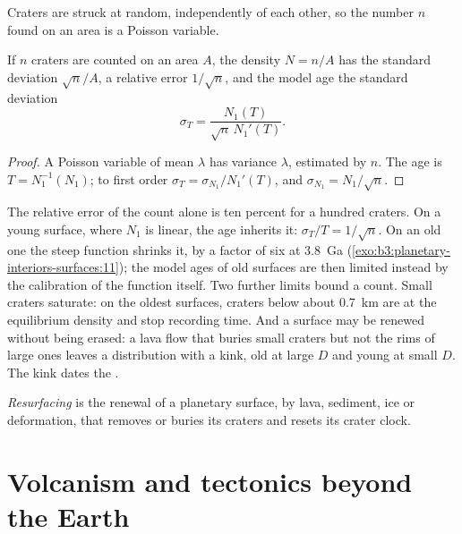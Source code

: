 Craters are struck at random, independently of each other, so the number
$n$ found on an area is a Poisson variable.

\begin{proposition}\label{prop:b3:planetary-interiors-surfaces:poisson}
If $n$ craters are counted on an area $A$, the density $N = n/A$ has the
standard deviation $\sqrt n/A$, a relative error $1/\sqrt n$, and the model
age the standard deviation
\[
  \sigma_T = \frac{N_1(T)}{\sqrt n\,N_1'(T)} .
\]
\end{proposition}

\begin{proof}
A Poisson variable of mean $\lambda$ has variance $\lambda$, estimated by
$n$. The age is $T = N_1^{-1}(N_1)$; to first order $\sigma_T =
\sigma_{N_1}/N_1'(T)$, and $\sigma_{N_1} = N_1/\sqrt n$.
\end{proof}

The relative error of the count alone is ten percent for a hundred
craters. On a young surface, where $N_1$ is linear, the age inherits it:
$\sigma_T/T = 1/\sqrt n$. On an old one the steep function shrinks it, by
a factor of six at \qty{3.8}{Ga} (\cref{exo:b3:planetary-interiors-surfaces:11});
the model ages of old surfaces are then limited instead by the calibration
of the function itself. Two further limits bound a count. Small craters
saturate: on the oldest surfaces, craters below about \qty{0.7}{km} are at
the equilibrium density and stop recording time. And a surface may be renewed
without being erased: a lava flow that buries small craters but not the
rims of large ones leaves a distribution with a kink, old at large $D$ and
young at small $D$. The kink dates the .

\begin{definition}[Resurfacing]\label{def:b3:planetary-interiors-surfaces:resurfacing}
\emph{Resurfacing} is the renewal of a planetary
surface, by lava, sediment, ice or deformation, that removes or buries its
craters and resets its crater clock.
\end{definition}

\section{Volcanism and tectonics beyond the Earth}\label{sec:b3:planetary-interiors-surfaces:volcanism}

